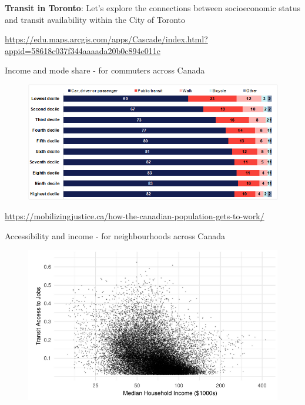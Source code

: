 \documentclass[aspectratio=169]{beamer}
\begin{document}
\begin{frame}
	
	
	\textbf{Transit in Toronto}: Let's explore the connections between socioeconomic status and transit availability within the City of Toronto
	
	\vspace{2mm}
	
	
	\url{https://edu.maps.arcgis.com/apps/Cascade/index.html?appid=58618c037f344aaaada20b0c894e011c}
	
	
\end{frame}




\begin{frame}
	
	Income and mode share - for commuters across Canada
	
	\begin{figure}
		\centering
		\includegraphics[width=0.94\linewidth]{images/income_mode_canada.png}
	\end{figure}
	
	\tiny\url{https://mobilizingjustice.ca/how-the-canadian-population-gets-to-work/}
	
\end{frame}




\begin{frame}
	
	Accessibility and income - for neighbourhoods across Canada
	
	\begin{figure}
		\centering
		\includegraphics[width=0.94\linewidth]{images/access_income.png}
	\end{figure}
	
\end{frame}
\end{document}
